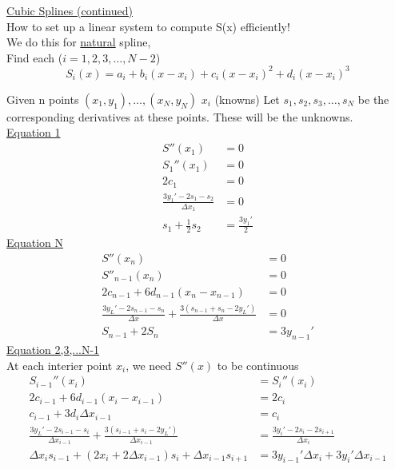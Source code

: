 \documentclass[10pt,usletter]{article}
\begin{document}
\underline{Cubic Splines (continued)}\\
How to set up a linear system to compute S(x) efficiently!\\
We do this for \underline{natural} spline,\\
Find each ($i=1,2,3,\hdots,N-2$)
$$S_i(x)=a_i+b_i(x-x_i)+c_i(x-x_i)^2+d_i(x-x_i)^3$$

Given n points $(x_1, y_1),\hdots, (x_N, y_N)$ $x_i$ (knowns)
Let $s_1,s_2,s_3,\hdots,s_N$ be the corresponding derivatives at these points. These will be the unknowns.\\
\underline{Equation 1}
\begin{align*}
S''(x_1)&=0 \\
S_1''(x_1)&=0 \\
2c_1&=0\\
\frac{3y_1'-2s_1-s_2}{\Delta x_1}&=0\\
s_1+\frac{1}{2}s_2&=\frac{3y_1'}{2}
\end{align*}
\underline{Equation N}
\begin{align*}
S''(x_n)&=0\\
S''_{n-1}(x_n)&=0\\
2c_{n-1}+6d_{n-1}(x_n-x_{n-1})&=0\\
\frac{3y_L'-2s_{n-1}-s_{n}}{\Delta x}+\frac{3(s_{n-1}+s_n-2y_L')}{\Delta x}&=0\\
S_{n-1}+2S_n&=3y_{n-1}'
\end{align*}
\underline{Equation 2,3,...N-1}\\
At each interier point $x_i$, we need $S''(x)$ to be continuous
\begin{align*}
S_{i-1}''(x_i)&=S_i''(x_i)\\
2c_{i-1}+6d_{i-1}(x_i-x_{i-1})&=2c_i\\
c_{i-1}+3d_i\Delta x_{i-1}&=c_i\\
\frac{3y_L'-2s_{i-1}-s_i}{\Delta x_{i-1}}+\frac{3(s_{i-1}+s_i-2y_L')}{\Delta x_{i-1}}&=\frac{3y_i'-2s_i-2s_{i+1}}{\Delta x_i}\\
\Delta x_i s_{i-1}+(2x_i+2\Delta x_{i-1}) s_i+ \Delta x_{i-1}s_{i+1}&=3y_{i-1}'\Delta x_i + 3y_i' \Delta x_{i-1}
\end{align*}
\end{document}
